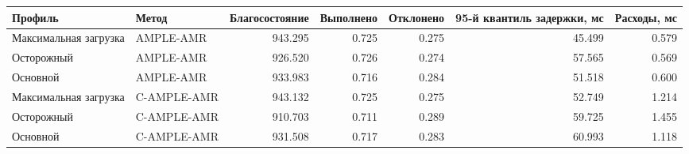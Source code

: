 \begin{tabular}{llrrrrr}
\toprule
 Профиль & Метод & Благосостояние & Выполнено & Отклонено & 95-й квантиль задержки, мс & Расходы, мс \\
\midrule
 Максимальная загрузка & AMPLE-AMR & 943.295 & 0.725 & 0.275 & 45.499 & 0.579 \\
 Осторожный & AMPLE-AMR & 926.520 & 0.726 & 0.274 & 57.565 & 0.569 \\
 Основной & AMPLE-AMR & 933.983 & 0.716 & 0.284 & 51.518 & 0.600 \\
 Максимальная загрузка & C-AMPLE-AMR & 943.132 & 0.725 & 0.275 & 52.749 & 1.214 \\
 Осторожный & C-AMPLE-AMR & 910.703 & 0.711 & 0.289 & 59.725 & 1.455 \\
 Основной & C-AMPLE-AMR & 931.508 & 0.717 & 0.283 & 60.993 & 1.118 \\
\bottomrule
\end{tabular}
